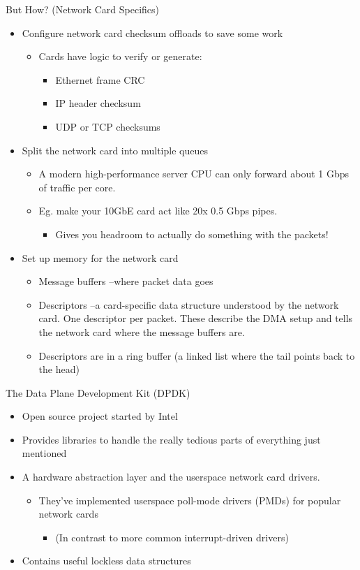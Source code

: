 \documentclass[presentation]{beamer}
\begin{document}
\begin{frame}[label={sec:orgd96bbfc}]{But How? (Network Card Specifics)}
\begin{itemize}
\item Configure network card checksum offloads to save some work
\begin{itemize}
\item Cards have logic to verify or generate:
\begin{itemize}
\item Ethernet frame CRC
\item IP header checksum
\item UDP or TCP checksums
\end{itemize}
\end{itemize}
\item Split the network card into multiple queues
\begin{itemize}
\item A modern high-performance server CPU can only forward about 1
Gbps of traffic per core.
\item Eg. make your 10GbE card act like 20x 0.5 Gbps pipes.
\begin{itemize}
\item Gives you headroom to actually do something with the packets!
\end{itemize}
\end{itemize}
\item Set up memory for the network card
\begin{itemize}
\item Message buffers --where packet data goes
\item Descriptors --a card-specific data structure understood by the
network card. One descriptor per packet. These describe the DMA
setup and tells the network card where the message buffers are.
\item Descriptors are in a ring buffer (a linked list where the tail
points back to the head)
\end{itemize}
\end{itemize}
\end{frame}
\begin{frame}[label={sec:org7c44d43}]{The Data Plane Development Kit (DPDK)}
\begin{itemize}
\item Open source project started by Intel
\item Provides libraries to handle the really tedious parts of
everything just mentioned
\item A hardware abstraction layer and the userspace network card
drivers.
\begin{itemize}
\item They've implemented userspace poll-mode drivers (PMDs) for
popular network cards
\begin{itemize}
\item (In contrast to more common interrupt-driven drivers)
\end{itemize}
\end{itemize}
\item Contains useful lockless data structures
\end{itemize}
\end{frame}
\end{document}
